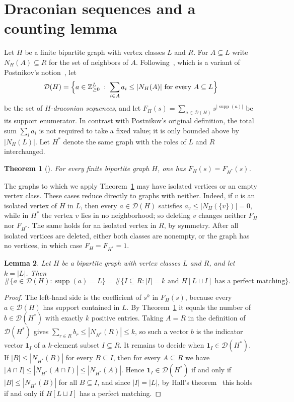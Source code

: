 \documentclass[11pt]{amsart}
\newtheorem{theorem}{Theorem}[section]
\newtheorem{lemma}[theorem]{Lemma}
\theoremstyle{definition}
\theoremstyle{remark}
\numberwithin{equation}{section}
\newcommand{\Zge}{\mathbb{Z}_{\ge 0}}
\newcommand{\supp}{\operatorname{supp}}
\newcommand{\Dr}{\mathcal{D}}
\begin{document}
\section{Draconian sequences and a counting lemma}\label{sec:prelim}

Let $H$ be a finite bipartite graph with vertex classes $L$ and $R$. For $A\subseteq L$ write $N_H(A)\subseteq R$ for the set of neighbors of $A$. Following~\cite[Definition~1.1]{DHLTW}, which is a variant of Postnikov's notion~\cite{Pos}, let
\[
\Dr(H)=\Bigl\{a\in\Zge^{L} \;:\; \sum_{i\in A}a_i\le |N_H(A)| \text{ for every } A\subseteq L\Bigr\}
\]
be the set of \emph{$H$-draconian sequences}, and let $F_H(s)=\sum_{a\in\Dr(H)} s^{|\supp(a)|}$ be its support enumerator. In contrast with Postnikov's original definition, the total sum $\sum_i a_i$ is not required to take a fixed value; it is only bounded above by $|N_H(L)|$. Let $H^*$ denote the same graph with the roles of $L$ and $R$ interchanged.

\begin{theorem}[{\cite[Theorem~1.3]{DHLTW}}]\label{thm:DHLTW}
For every finite bipartite graph $H$, one has $F_H(s)=F_{H^*}(s)$.
\end{theorem}

The graphs to which we apply Theorem~\ref{thm:DHLTW} may have isolated vertices or an empty vertex class. These cases reduce directly to graphs with neither. Indeed, if $v$ is an isolated vertex of $H$ in $L$, then every $a\in\Dr(H)$ satisfies $a_v\le|N_H(\{v\})|=0$, while in $H^*$ the vertex $v$ lies in no neighborhood; so deleting $v$ changes neither $F_H$ nor $F_{H^*}$. The same holds for an isolated vertex in $R$, by symmetry. After all isolated vertices are deleted, either both classes are nonempty, or the graph has no vertices, in which case $F_H=F_{H^*}=1$.

\begin{lemma}\label{lem:fullsupport}
Let $H$ be a bipartite graph with vertex classes $L$ and $R$, and let $k=|L|$. Then
\[
\#\{a\in\Dr(H) : \supp(a)=L\}=\#\{I\subseteq R : |I|=k \text{ and } H[L\sqcup I] \text{ has a perfect matching}\}.
\]
\end{lemma}

\begin{proof}
The left-hand side is the coefficient of $s^k$ in $F_H(s)$, because every $a\in\Dr(H)$ has support contained in $L$. By Theorem~\ref{thm:DHLTW} it equals the number of $b\in\Dr(H^*)$ with exactly $k$ positive entries. Taking $A=R$ in the definition of $\Dr(H^*)$ gives $\sum_{r\in R}b_r\le|N_{H^*}(R)|\le k$, so such a vector $b$ is the indicator vector $\mathbf 1_I$ of a $k$-element subset $I\subseteq R$. It remains to decide when $\mathbf 1_I\in\Dr(H^*)$. If $|B|\le|N_{H^*}(B)|$ for every $B\subseteq I$, then for every $A\subseteq R$ we have $|A\cap I|\le|N_{H^*}(A\cap I)|\le|N_{H^*}(A)|$. Hence $\mathbf 1_I\in\Dr(H^*)$ if and only if $|B|\le|N_{H^*}(B)|$ for all $B\subseteq I$, and since $|I|=|L|$, by Hall's theorem~\cite{Hall} this holds if and only if $H[L\sqcup I]$ has a perfect matching.
\end{proof}
\end{document}
